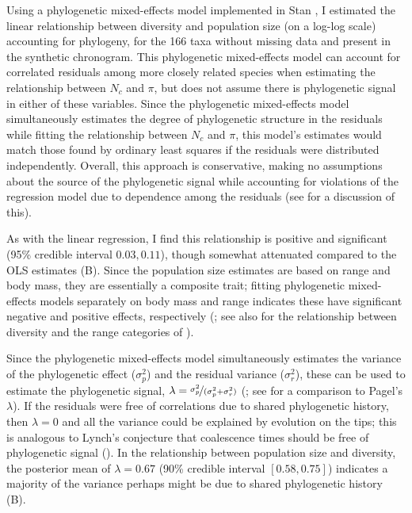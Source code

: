 \documentclass[9pt,lineno]{elife}
\begin{document}
Using a phylogenetic mixed-effects model
\citep{Lynch1991-tp,Hadfield2010-ql,De_Villemereuil2014-kt} implemented in Stan
\citep{Carpenter2017-xi,Stan_Development_Team2020-ea}, I estimated the linear
relationship between diversity and population size (on a log-log scale)
accounting for phylogeny, for the 166 taxa without missing data and present in
the synthetic chronogram. This phylogenetic mixed-effects model can account for
correlated residuals among more closely related species when estimating the
relationship between $N_c$ and $\pi$, but does not assume there is phylogenetic
signal in either of these variables. Since the phylogenetic mixed-effects model
simultaneously estimates the degree of phylogenetic structure in the residuals
while fitting the relationship between $N_c$ and $\pi$, this model's estimates
would match those found by ordinary least squares if the residuals were
distributed independently. Overall, this approach is conservative, making no
assumptions about the source of the phylogenetic signal while accounting for
violations of the regression model due to dependence among the residuals (see
\cite{Revell2010-mf} for a discussion of this).

As with the linear regression, I find this relationship is positive and
significant (95\% credible interval $0.03, 0.11$), though somewhat attenuated
compared to the OLS estimates (B). Since the population size estimates
are based on range and body mass, they are essentially a composite trait;
fitting phylogenetic mixed-effects models separately on body mass and range
indicates these have significant negative and positive effects, respectively
(; see also  for
the relationship between diversity and the range categories of
\cite{Leffler2012-zj}).

Since the phylogenetic mixed-effects model simultaneously estimates the
variance of the phylogenetic effect ($\sigma_p^2$) and the residual variance
($\sigma_r^2$), these can be used to estimate the phylogenetic signal, $\lambda
= \nicefrac{\sigma_p^2}{(\sigma_p^2 + \sigma_r^2)}$
(\cite{Lynch1991-tp,De_Villemereuil2014-kt}; see \cite{Freckleton2002-ly} for a
comparison to Pagel's $\lambda$). If the residuals were free of correlations
due to shared phylogenetic history, then $\lambda = 0$ and all the variance
could be explained by evolution on the tips; this is analogous to Lynch's
conjecture that coalescence times should be free of phylogenetic signal
(\citeyear{Lynch2011-qv}). In the relationship between population size and
diversity, the posterior mean of $\lambda = 0.67$ (90\% credible interval
$[0.58, 0.75]$) indicates a majority of the variance perhaps might be
due to shared phylogenetic history (B).
\end{document}
